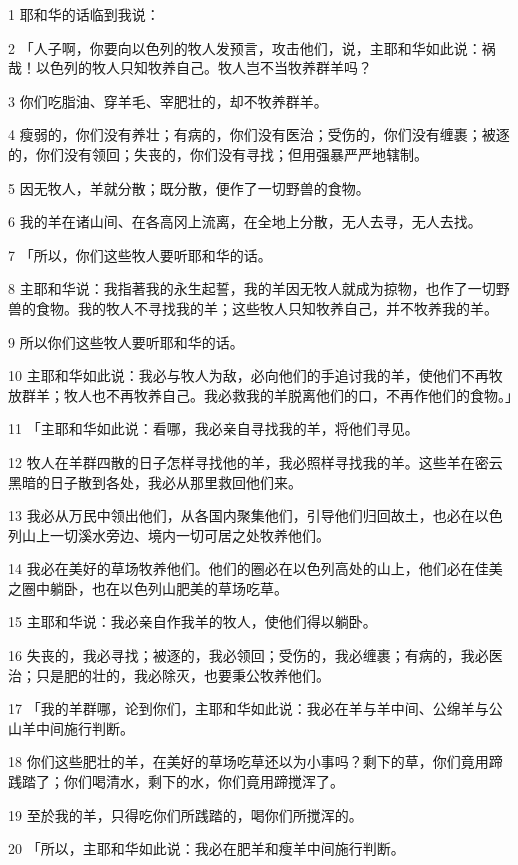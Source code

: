\par 1 耶和华的话临到我说：
\par 2 「人子啊，你要向以色列的牧人发预言，攻击他们，说，主耶和华如此说：祸哉！以色列的牧人只知牧养自己。牧人岂不当牧养群羊吗？
\par 3 你们吃脂油、穿羊毛、宰肥壮的，却不牧养群羊。
\par 4 瘦弱的，你们没有养壮；有病的，你们没有医治；受伤的，你们没有缠裹；被逐的，你们没有领回；失丧的，你们没有寻找；但用强暴严严地辖制。
\par 5 因无牧人，羊就分散；既分散，便作了一切野兽的食物。
\par 6 我的羊在诸山间、在各高冈上流离，在全地上分散，无人去寻，无人去找。
\par 7 「所以，你们这些牧人要听耶和华的话。
\par 8 主耶和华说：我指著我的永生起誓，我的羊因无牧人就成为掠物，也作了一切野兽的食物。我的牧人不寻找我的羊；这些牧人只知牧养自己，并不牧养我的羊。
\par 9 所以你们这些牧人要听耶和华的话。
\par 10 主耶和华如此说：我必与牧人为敌，必向他们的手追讨我的羊，使他们不再牧放群羊；牧人也不再牧养自己。我必救我的羊脱离他们的口，不再作他们的食物。」
\par 11 「主耶和华如此说：看哪，我必亲自寻找我的羊，将他们寻见。
\par 12 牧人在羊群四散的日子怎样寻找他的羊，我必照样寻找我的羊。这些羊在密云黑暗的日子散到各处，我必从那里救回他们来。
\par 13 我必从万民中领出他们，从各国内聚集他们，引导他们归回故土，也必在以色列山上一切溪水旁边、境内一切可居之处牧养他们。
\par 14 我必在美好的草场牧养他们。他们的圈必在以色列高处的山上，他们必在佳美之圈中躺卧，也在以色列山肥美的草场吃草。
\par 15 主耶和华说：我必亲自作我羊的牧人，使他们得以躺卧。
\par 16 失丧的，我必寻找；被逐的，我必领回；受伤的，我必缠裹；有病的，我必医治；只是肥的壮的，我必除灭，也要秉公牧养他们。
\par 17 「我的羊群哪，论到你们，主耶和华如此说：我必在羊与羊中间、公绵羊与公山羊中间施行判断。
\par 18 你们这些肥壮的羊，在美好的草场吃草还以为小事吗？剩下的草，你们竟用蹄践踏了；你们喝清水，剩下的水，你们竟用蹄搅浑了。
\par 19 至於我的羊，只得吃你们所践踏的，喝你们所搅浑的。
\par 20 「所以，主耶和华如此说：我必在肥羊和瘦羊中间施行判断。
